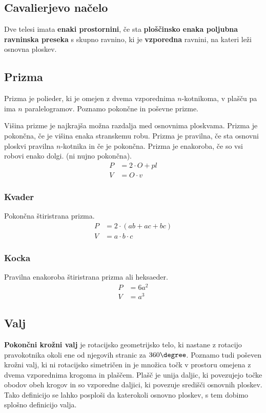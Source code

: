 \documentclass[a4paper,oneside,12pt,fleqn]{article}
\newcommand\krat\cdot
\def\deg{\degree}
\numberwithin{equation}{section}
\begin{document}
\subsection{Cavalierjevo načelo}
\label{sec:tel:cavalieri}
Dve telesi imata \textbf{enaki prostornini}, če sta \textbf{ploščinsko enaka poljubna ravninska preseka} s
skupno ravnino, ki je \textbf{vzporedna} ravnini, na kateri leži osnovna ploskev.

\subsection{Prizma}
\label{sec:tel:priz}
Prizma je polieder, ki je omejen z dvema vzporednima $n$-kotnikoma, v plašču pa ima $n$
paralelogramov. Poznamo pokončne in poševne prizme.

Višina prizme je najkrajša možna razdalja med osnovnima ploskvama.
Prizma je pokončna, če je višina enaka stranskemu robu. Prizma je pravilna, če sta osnovni
ploskvi pravilna $n$-kotnika in če je pokončna. Prizma je enakoroba, če so vsi robovi
enako dolgi. (ni nujno pokončna).
\begin{align*}
  P &= 2 \krat O + pl \\
  V &= O \krat v
\end{align*}

\parbox[t]{0.5\textwidth}{
\subsubsection{Kvader}
\label{sec:tel:priz:kvad}
Pokončna štiristrana prizma.
\begin{align*}
  P &= 2\krat (ab+ac+bc) \\
  V &= a\krat b\krat c
\end{align*}
}\parbox[t]{0.5\textwidth}{
\subsubsection{Kocka}
\label{sec:tel:priz:koc}
Pravilna enakoroba štiristrana prizma ali heksaeder.
\begin{align*}
    P &= 6a^2 \\
    V &= a^3
\end{align*}
}

\subsection{Valj}
\label{sec:tel:valj}
\textbf{Pokončni krožni valj} je rotacijsko geometrijsko telo, ki nastane z rotacijo pravokotnika okoli ene
od njegovih stranic za $360\deg$. Poznamo tudi poševen krožni valj, ki ni rotacijsko simetričen
in je množica točk v prostoru omejena z dvema vzporednima krogoma in plaščem. Plašč je unija
daljic, ki povezujejo točke obodov obeh krogov in so vzporedne daljici, ki povezuje
središči osnovnih ploskev. Tako definicijo se lahko posploši da katerokoli osnovno
ploskev, s tem dobimo splošno definicijo valja.
\end{document}
